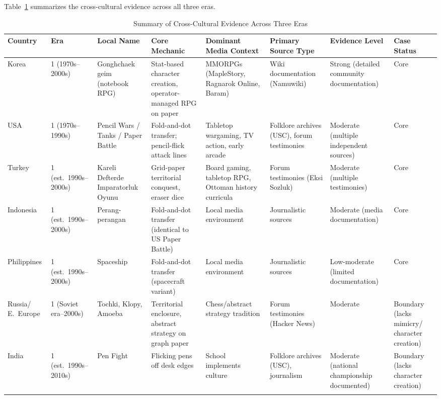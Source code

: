 \documentclass[12pt]{article}
\begin{document}
Table~\ref{tab:evidence} summarizes the cross-cultural evidence across all three eras.

\begin{table}[htbp]
\centering
\caption{Summary of Cross-Cultural Evidence Across Three Eras}
\label{tab:evidence}
\small
\begin{tabular}{@{}p{1.4cm}p{1.2cm}p{1.8cm}p{2.0cm}p{2.0cm}p{1.6cm}p{1.8cm}p{1.2cm}@{}}
\toprule
Country & Era & Local Name & Core Mechanic & Dominant Media Context & Primary Source Type & Evidence Level & Case Status \\
\midrule
Korea & 1 (1970s--2000s) & Gonghchaek geim (notebook RPG) & Stat-based character creation, operator-managed RPG on paper & MMORPGs (MapleStory, Ragnarok Online, Baram) & Wiki documentation (Namuwiki) & Strong (detailed community documentation) & Core \\
\addlinespace
USA & 1 (1970s--1990s) & Pencil Wars / Tanks / Paper Battle & Fold-and-dot transfer; pencil-flick attack lines & Tabletop wargaming, TV action, early arcade & Folklore archives (USC), forum testimonies & Moderate (multiple independent sources) & Core \\
\addlinespace
Turkey & 1 (est.\ 1990s--2000s) & Kareli Defterde Imparatorluk Oyunu & Grid-paper territorial conquest, eraser dice & Board gaming, tabletop RPG, Ottoman history curricula & Forum testimonies (Eksi Sozluk) & Moderate (multiple testimonies) & Core \\
\addlinespace
Indonesia & 1 (est.\ 1990s--2000s) & Perang-perangan & Fold-and-dot transfer (identical to US Paper Battle) & Local media environment & Journalistic sources & Moderate (media documentation) & Core \\
\addlinespace
Philippines & 1 (est.\ 1990s--2000s) & Spaceship & Fold-and-dot transfer (spacecraft variant) & Local media environment & Journalistic sources & Low-moderate (limited documentation) & Core \\
\addlinespace
Russia/ E.~Europe & 1 (Soviet era--2000s) & Tochki, Klopy, Amoeba & Territorial enclosure, abstract strategy on graph paper & Chess/abstract strategy tradition & Forum testimonies (Hacker News) & Moderate & Boundary (lacks mimicry/ character creation) \\
\addlinespace
India & 1 (est.\ 1990s--2010s) & Pen Fight & Flicking pens off desk edges & School implements culture & Folklore archives (USC), journalism & Moderate (national championship documented) & Boundary (lacks character creation) \\
\addlinespace

\end{tabular}
\end{table}
\end{document}
